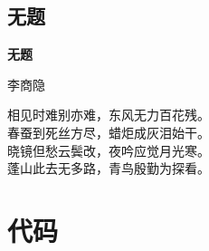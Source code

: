 \subsection{无题}
\begin{center}
\textbf{无题}

{\kaishu 李商隐}

\vspace*{1em}
相见时难别亦难，东风无力百花残。\\
春蚕到死丝方尽，蜡炬成灰泪始干。\\
晓镜但愁云鬓改，夜吟应觉月光寒。\\
蓬山此去无多路，青鸟殷勤为探看。
\end{center}

\section{代码}



